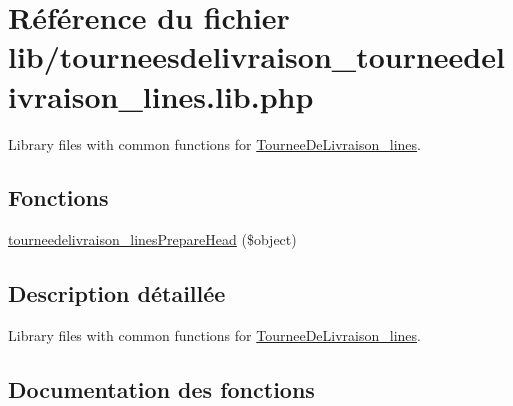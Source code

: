 \hypertarget{tourneesdelivraison__tourneedelivraison__lines_8lib_8php}{}\section{Référence du fichier lib/tourneesdelivraison\+\_\+tourneedelivraison\+\_\+lines.lib.\+php}
\label{tourneesdelivraison__tourneedelivraison__lines_8lib_8php}


Library files with common functions for \hyperlink{classTourneeDeLivraison__lines}{Tournee\+De\+Livraison\+\_\+lines}.  


\subsection*{Fonctions}
\begin{DoxyCompactItemize}
\item 
\hyperlink{tourneesdelivraison__tourneedelivraison__lines_8lib_8php_a72f2188753735e449dbefdb6b66e5b05}{tourneedelivraison\+\_\+lines\+Prepare\+Head} (\$object)
\end{DoxyCompactItemize}


\subsection{Description détaillée}
Library files with common functions for \hyperlink{classTourneeDeLivraison__lines}{Tournee\+De\+Livraison\+\_\+lines}. 



\subsection{Documentation des fonctions}
\mbox{\label{tourneesdelivraison__tourneedelivraison__lines_8lib_8php_a72f2188753735e449dbefdb6b66e5b05}} 
